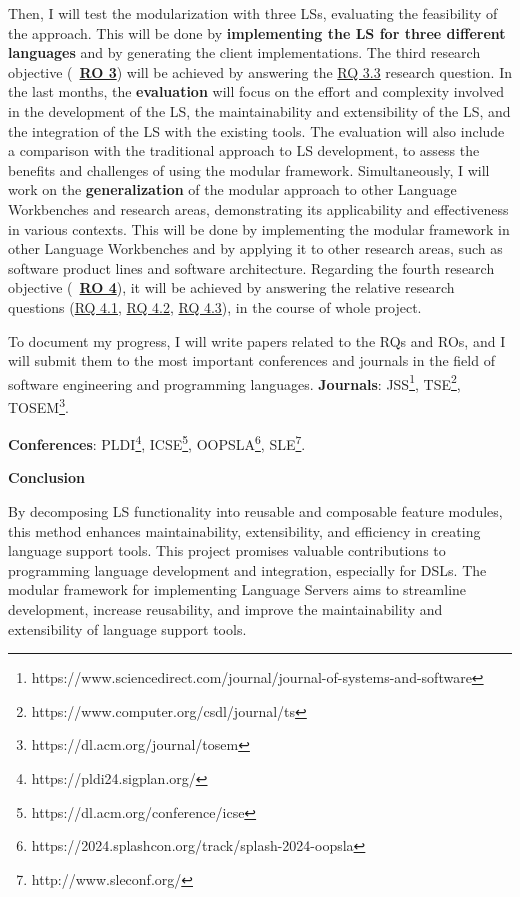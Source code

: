 Then, I will test the modularization with three LSs, evaluating the feasibility of the approach. This will be done by \textbf{implementing the LS for three different languages} and by generating the client implementations. The third research objective (~\hyperlink{ro3}{\textbf{RO 3}}) will be achieved by answering the \hyperlink{rq33}{\textsf{RQ 3.3}} research question.
In the last months, the \textbf{evaluation} will focus on the effort and complexity involved in the development of the LS, the maintainability and extensibility of the LS, and the integration of the LS with the existing tools. The evaluation will also include a comparison with the traditional approach to LS development, to assess the benefits and challenges of using the modular framework.
Simultaneously, I will work on the \textbf{generalization} of the modular approach to other Language Workbenches and research areas, demonstrating its applicability and effectiveness in various contexts. This will be done by implementing the modular framework in other Language Workbenches and by applying it to other research areas, such as software product lines and software architecture.
Regarding the fourth research objective (~\hyperlink{ro4}{\textbf{RO 4}}), it will be achieved by answering the relative research questions (\hyperlink{rq41}{\textsf{RQ 4.1}}, \hyperlink{rq42}{\textsf{RQ 4.2}}, \hyperlink{rq43}{\textsf{RQ 4.3}}), in the course of whole project.

To document my progress, I will write papers related to the \textsf{RQ}s and \textsf{RO}s, and I will submit them to the most important conferences and journals in the field of software engineering and programming languages.
\noindent
\textbf{Journals}: JSS\footnote{https://www.sciencedirect.com/journal/journal-of-systems-and-software}, TSE\footnote{https://www.computer.org/csdl/journal/ts}, TOSEM\footnote{https://dl.acm.org/journal/tosem}.

\noindent
\textbf{Conferences}: PLDI\footnote{https://pldi24.sigplan.org/}, ICSE\footnote{https://dl.acm.org/conference/icse}, OOPSLA\footnote{https://2024.splashcon.org/track/splash-2024-oopsla}, SLE\footnote{http://www.sleconf.org/}.


\hfill \break
\noindent
\textbf{Conclusion}

By decomposing LS functionality into reusable and composable feature modules, this method enhances maintainability, extensibility, and efficiency in creating language support tools. This project promises valuable contributions to programming language development and integration, especially for DSLs. The modular framework for implementing Language Servers aims to streamline development, increase reusability, and improve the maintainability and extensibility of language support tools.
